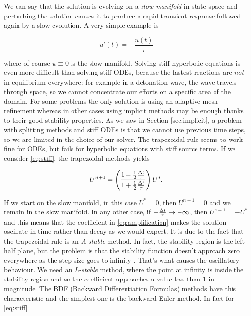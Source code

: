 \documentclass[journal,onecolumn]{IEEEtran}
\begin{document}
We can say that the solution is evolving on a \textit{slow manifold} in state space and perturbing the solution causes it to produce a rapid transient response followed again by a slow evolution. A very simple example is

\begin{equation}\label{eq:stiff}
	u'(t)=-\frac{u(t)}{\tau}
\end{equation}

where of course $u\equiv0$ is the slow manifold. Solving stiff hyperbolic equations is even more difficult than solving stiff ODEs, because the fastest reactions are \textit{not} in equilibrium everywhere: for example in a detonation wave, the wave travels through space, so we cannot concentrate our efforts on a specific area of the domain. For some problems the only solution is using an adaptive mesh refinement whereas in other cases using implicit methods may be enough thanks to their good stability properties. As we saw in Section \ref{sec:implicit}, a problem with splitting methods and stiff ODEs is that we cannot use previous time steps, so we are limited in the choice of our solver. The trapezoidal rule seems to work fine for ODEs, but fails for hyperbolic equations with stiff source terms. If we consider \eqref{eq:stiff}, the trapezoidal methods yields

\begin{equation}\label{eq:amplification}
	U^{n+1} = \left(\frac{1-\frac{1}{2}\frac{\Delta t}{\tau}}{1+\frac{1}{2}\frac{\Delta t}{\tau}}\right)U^*.
\end{equation}

If we start on the slow manifold, in this case $U^*=0$, then $U^{n+1}=0$ and we remain in the slow manifold. In any other case, if $-\frac{\Delta t}{\tau}\rightarrow-\infty$, then $U^{n+1}=-U^*$ and this means that the coefficient in \eqref{eq:amplification} makes the solution oscillate in time rather than decay as we would expect. It is due to the fact that the trapezoidal rule is an \textit{A-stable} method. In fact, the stability region is the left half plane, but the problem is that the stability function doesn't approach zero everywhere as the step size goes to infinity \cite{Byron}. That's what causes the oscillatory behaviour. We need an \textit{L-stable} method, where the point at infinity is inside the stability region and so the coefficient approaches a value less than $1$ in magnitude. The BDF (Backward Differentiation Formulas) methods have this characteristic and the simplest one is the backward Euler method. In fact for \eqref{eq:stiff}
\end{document}
